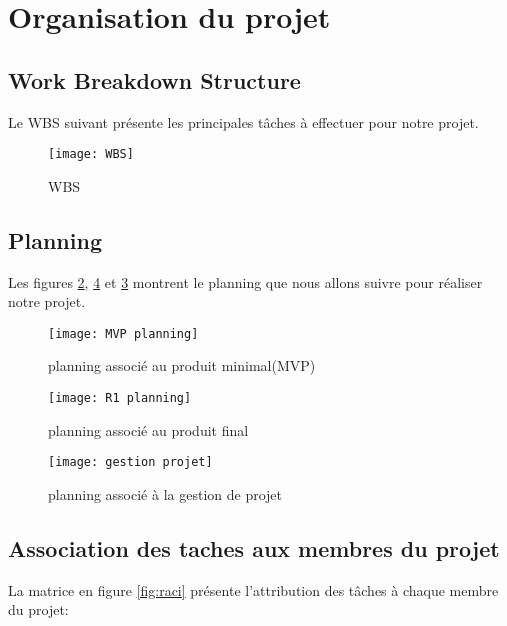 \chapter*{Organisation du projet}
\label{sec:organisation}


\section*{Work Breakdown Structure}
Le WBS suivant présente les principales tâches à effectuer pour notre projet.

\begin{figure}[!h]
	\centering
	\texttt{[image: WBS]}
	\caption{WBS}
	\label{fig:wbs}
\end{figure}



\section*{Planning}
Les figures \ref{fig:mvp-plan}, \ref{fig:gestion-proj} et \ref{fig:r1-plan} montrent le planning que nous allons suivre pour réaliser notre projet.

\begin{figure}[!ht]
	\centering
	\texttt{[image: MVP planning]}
	\caption{planning associé au produit minimal(MVP)}
	\label{fig:mvp-plan}
\end{figure}

\begin{figure}[!ht]
	\centering
	\texttt{[image: R1 planning]}
	\caption{planning associé au produit final}
	\label{fig:r1-plan}
\end{figure}

\begin{figure}[!ht]
	\centering
	\texttt{[image: gestion projet]}
	\caption{planning associé à la gestion de projet}
	\label{fig:gestion-proj}
\end{figure}

\section*{Association des taches aux membres du projet}
La matrice en figure \ref{fig:raci} présente l'attribution des tâches à chaque membre du projet:


